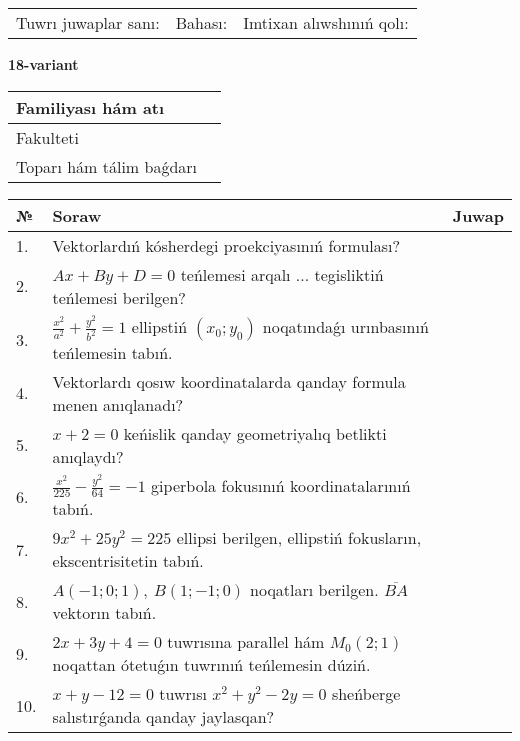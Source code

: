 \documentclass{article}
\begin{document}
\vspace{1cm}

\begin{tabular}{lll}
Tuwrı juwaplar sanı: \underline{\hspace{1.5cm}} & 
Bahası: \underline{\hspace{1.5cm}} & 
Imtixan alıwshınıń qolı: \underline{\hspace{2cm}} \\
\end{tabular}

\egroup

\newpage


\textbf{18-variant}\\

\bgroup
\def\arraystretch{1.6} %

\begin{tabular}{|m{5.7cm}|m{9.5cm}|}
\hline
Familiyası hám atı & \\
\hline
Fakulteti  & \\
\hline
Toparı hám tálim baǵdarı  & \\
\hline
\end{tabular}

\vspace{1cm}

\begin{tabular}{|m{0.7cm}|m{10cm}|m{4cm}|}
\hline
№ & Soraw & Juwap \\
\hline
1. & Vektorlardıń kósherdegi proekciyasınıń formulası? &  \\
\hline
2. & $Ax+By+D=0$ teńlemesi arqalı ... tegisliktiń teńlemesi berilgen? &  \\
\hline
3. & $\frac{x^2}{a^2}+\frac{y^2}{b^2}=1$ ellipstiń $(x_0;y_0)$ noqatındaǵı urınbasınıń teńlemesin tabıń. &  \\
\hline
4. & Vektorlardı qosıw koordinatalarda qanday formula menen anıqlanadı? &  \\
\hline
5. & $x+2=0$ keńislik qanday geometriyalıq betlikti anıqlaydı? &  \\
\hline
6. & $\frac{x^{2}}{225}-\frac{y^{2}}{64}=-1$ giperbola fokusınıń koordinatalarınıń tabıń. &  \\
\hline
7. & $9x^{2}+25y^{2}=225$ ellipsi berilgen, ellipstiń fokusların, ekscentrisitetin tabıń. &  \\
\hline
8. & $A (-1;0;1),\ B (1;-1;0)$ noqatları berilgen. $\overline{BA}$ vektorın tabıń. &  \\
\hline
9. & $2x+3y+4=0$ tuwrısına parallel hám $M_{0} (2;1)$ noqattan ótetuǵın tuwrınıń teńlemesin dúziń. &  \\
\hline
10. & $x+y-12=0$ tuwrısı $x^{2}+y^{2}-2y=0$ sheńberge salıstırǵanda qanday jaylasqan? &  \\
\hline
\end{tabular}
\end{document}
